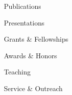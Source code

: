 \documentclass{cv} %
\begin{document}


\begin{rSection}{Publications}
\end{rSection}

\begin{rSection}{Presentations}
\end{rSection}

\begin{rSection}{Grants \& Fellowships}
\end{rSection}

\begin{rSection}{Awards \& Honors}
\end{rSection}

\begin{rSection}{Teaching}
\end{rSection}

\begin{rSection}{Service \& Outreach}
\end{rSection}
\end{document}
